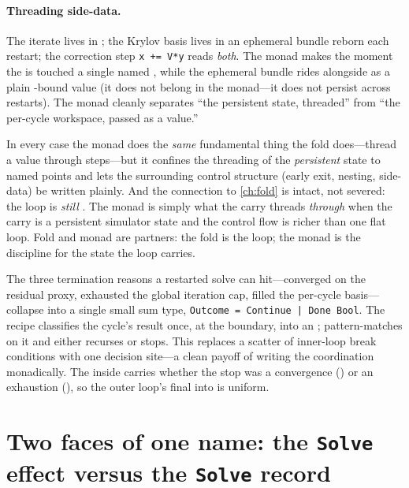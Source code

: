 \paragraph{Threading side-data.} The iterate  lives in ; the
Krylov basis lives in an ephemeral bundle reborn each restart; the correction step
\lstinline[style=l4style]|x += V*y| reads \emph{both}. The monad makes the moment the
 is touched a single named , while the ephemeral bundle
rides alongside as a plain -bound value (it does not belong in the monad---it
does not persist across restarts). The monad cleanly separates ``the persistent state,
threaded'' from ``the per-cycle workspace, passed as a value.''

\noindent In every case the monad does the \emph{same} fundamental thing the fold
does---thread a value through steps---but it confines the threading of the
\emph{persistent} state to named  points and lets the surrounding control
structure (early exit, nesting, side-data) be written plainly. And the connection to
\cref{ch:fold} is intact, not severed: the loop is \emph{still} .
The monad is simply what the carry threads \emph{through} when the carry is a
persistent simulator state and the control flow is richer than one flat loop. Fold and
monad are partners: the fold is the loop; the monad is the discipline for the state the
loop carries.

\begin{notationbox}
The three termination reasons a restarted solve can hit---converged on the residual
proxy, exhausted the global iteration cap, filled the per-cycle basis---collapse into
a single small sum type, \lstinline[style=l4style]@Outcome = Continue | Done Bool@.
The recipe  classifies the cycle's result once, at the boundary,
into an ;  pattern-matches on it and either recurses
or stops. This replaces a scatter of inner-loop break conditions with one decision
site---a clean payoff of writing the coordination monadically. The  inside
 carries whether the stop was a convergence () or an
exhaustion (), so the outer loop's final  into
 is uniform.
\end{notationbox}

\section{Two faces of one name: the \texttt{Solve} effect versus the \texttt{Solve} record}
\label{sec:overload}

